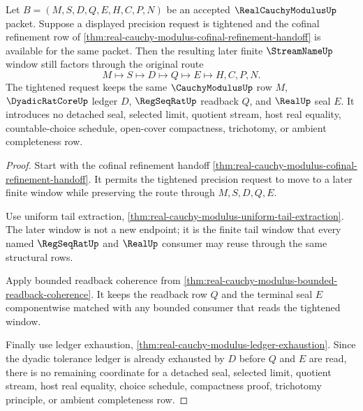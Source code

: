 \begin{theorem}
\label{thm:realcauchymodulus-finite-window-tightening}
Let $B=(M,S,D,Q,E,H,C,P,N)$ be an accepted $\RealCauchyModulusUp$ packet. Suppose a displayed precision request is tightened and the cofinal refinement row of \autoref{thm:real-cauchy-modulus-cofinal-refinement-handoff} is available for the same packet. Then the resulting later finite $\StreamNameUp$ window still factors through the original route
$$
M\longmapsto S\longmapsto D\longmapsto Q\longmapsto E\longmapsto H,C,P,N .
$$
The tightened request keeps the same $\CauchyModulusUp$ row $M$, $\DyadicRatCoreUp$ ledger $D$, $\RegSeqRatUp$ readback $Q$, and $\RealUp$ seal $E$. It introduces no detached seal, selected limit, quotient stream, host real equality, countable-choice schedule, open-cover compactness, trichotomy, or ambient completeness row.
\end{theorem}
\begin{proof}
Start with the cofinal refinement handoff \autoref{thm:real-cauchy-modulus-cofinal-refinement-handoff}. It permits the tightened precision request to move to a later finite window while preserving the route through $M,S,D,Q,E$.

Use uniform tail extraction, \autoref{thm:real-cauchy-modulus-uniform-tail-extraction}. The later window is not a new endpoint; it is the finite tail window that every named $\RegSeqRatUp$ and $\RealUp$ consumer may reuse through the same structural rows.

Apply bounded readback coherence from \autoref{thm:real-cauchy-modulus-bounded-readback-coherence}. It keeps the readback row $Q$ and the terminal seal $E$ componentwise matched with any bounded consumer that reads the tightened window.

Finally use ledger exhaustion, \autoref{thm:real-cauchy-modulus-ledger-exhaustion}. Since the dyadic tolerance ledger is already exhausted by $D$ before $Q$ and $E$ are read, there is no remaining coordinate for a detached seal, selected limit, quotient stream, host real equality, choice schedule, compactness proof, trichotomy principle, or ambient completeness row.
\end{proof}


